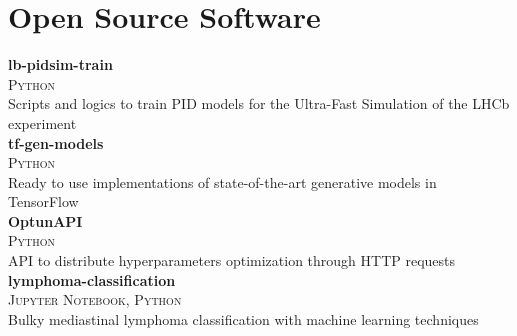 \newcommand{\pkgname}[1]
  {\normalsize \color{hlcolor-0} \textbf{#1}}

\newcommand{\pkginfo}[1]
  {\small \color{hlcolor-1} \textsc{#1}}
  
\newcommand{\pkgdesc}[1]
  {\normalsize \color{maincolor} {#1}}


\section*{Open Source Software}
\begin{cvcontent}
  \pkgname{lb-pidsim-train} \hfill
  \\
  \pkginfo{Python}\\
  \pkgdesc{Scripts and logics to train PID models for the Ultra-Fast Simulation of the LHCb experiment}
  \\ [3mm]
  \pkgname{tf-gen-models} \hfill
  \\
  \pkginfo{Python}\\
  \pkgdesc{Ready to use implementations of state-of-the-art generative models in TensorFlow}
  \\ [3mm]
  \pkgname{OptunAPI} \hfill
  \\
  \pkginfo{Python}\\
  \pkgdesc{API to distribute hyperparameters optimization through HTTP requests}
  \\ [3mm]
  \pkgname{lymphoma-classification} \hfill
  \\
  \pkginfo{Jupyter Notebook, Python}\\
  \pkgdesc{Bulky mediastinal lymphoma classification with machine learning techniques}
\end{cvcontent}